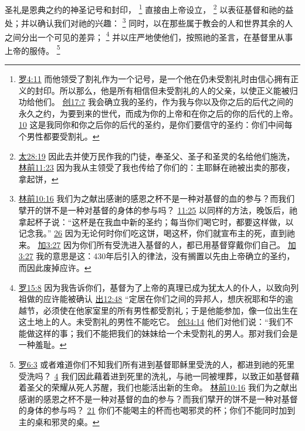\documentclass[12pt, a4paper, oneside]{ctexart}
\newcounter{parnum}[section]
\newcommand{\N}{%
   \noindent\refstepcounter{parnum}%
    \makebox[\parindent][l]{\textbf{\arabic{parnum}.}}}
\begin{document}
\N 圣礼是恩典之约的神圣记号和封印，
	\footnote {
		\href{https://biblehub.com/romans/4-11.htm}{罗4:11} 而他领受了割礼作为一个记号，是一个他在仍未受割礼时由信心拥有正义的封印。所以那么，他是所有相信但未受割礼的人的父亲，以使正义能被归功给他们。
		\href{https://biblehub.com/genesis/17-7.htm}{创17:7} 我会确立我的圣约，作为我与你以及你之后的后代之间的永久之约，为要到来的世代，而成为你的上帝和在你之后的你的后代的上帝。
		\href{https://biblehub.com/genesis/17-10.htm}{10} 这是我同你和你之后你的后代的圣约，是你们要信守的圣约：你们中间每个男性都要受割礼。
	}
	直接由上帝设立，
	\footnote {
		\href{https://biblehub.com/matthew/28-19.htm}{太28:19} 因此去并使万民作我的门徒，奉圣父、圣子和圣灵的名给他们施洗，
		\href{https://biblehub.com/1_corinthians/11-23.htm}{林前11:23} 因为我从主领受了我也传给了你们的：主耶稣在祂被出卖的那夜，拿起饼，
	}
	以表征基督和祂的益处；并以确认我们对祂的兴趣：
	\footnote {
		\href{https://biblehub.com/1_corinthians/10-16.htm}{林前10:16} 我们为之献出感谢的感恩之杯不是一种对基督的血的参与？而我们擘开的饼不是一种对基督的身体的参与吗？
		\href{https://biblehub.com/1_corinthians/11-25.htm}{11:25} 以同样的方法，晚饭后，祂拿起杯子说：“这杯是在我血中新的圣约；每当你们喝它时，都要这样做，以记念我。”
		\href{https://biblehub.com/1_corinthians/11-26.htm}{26} 因为无论何时你们吃这饼，喝这杯，你们就宣布主的死，直到祂来。
		\href{https://biblehub.com/galatians/3-27.htm}{加3:27} 因为你们所有受洗进入基督的人，都已用基督穿戴你们自己。
		\href{https://biblehub.com/galatians/3-17.htm}{加3:27} 我的意思是这：430年后引入的律法，没有搁置以先由上帝确立的圣约，而因此废掉应许。
	}
	同时，以在那些属于教会的人和世界其余的人之间分出一个可见的差异；
	\footnote {
		\href{https://biblehub.com/romans/15-8.htm}{罗15:8} 因为我告诉你们，基督为了上帝的真理已成为犹太人的仆人，以致向列祖做的应许能被确认
		\href{https://biblehub.com/exodus/12-48.htm}{出12:48} “定居在你们之间的异邦人，想庆祝耶和华的逾越节，必须使在他家室里的所有男性都受割礼；于是他能参加，像一位出生在这土地上的人。未受割礼的男性不能吃它。
		\href{https://biblehub.com/genesis/34-14.htm}{创34:14} 他们对他们说：“我们不能做这样的事；我们不能把我们的妹妹给一个未受割礼的男人。那对我们会是一种羞耻。
	}
	并以庄严地使他们，按照祂的圣言，在基督里从事上帝的服侍。
	\footnote {
		\href{https://biblehub.com/romans/6-3.htm}{罗6:3} 或者难道你们不知我们所有进到基督耶稣里受洗的人，都进到祂的死里受洗吗？
		\href{https://biblehub.com/romans/6-4.htm}{4} 我们因此藉着进到死里的洗礼，与祂一同被埋葬，以致正如基督藉着圣父的荣耀从死人苏醒，我们也能活出新的生命。
		\href{https://biblehub.com/1_corinthians/10-16.htm}{林前10:16} 我们为之献出感谢的感恩之杯不是一种对基督的血的参与？而我们擘开的饼不是一种对基督的身体的参与吗？
		\href{https://biblehub.com/1_corinthians/10-21.htm}{21} 你们不能喝主的杯而也喝邪灵的杯；你们不能同时加到主的桌和邪灵的桌。
	}
\end{document}
